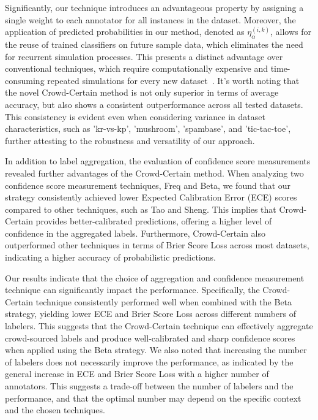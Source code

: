 Significantly, our technique introduces an advantageous property by assigning a single weight to each annotator for all instances in the dataset. Moreover, the application of predicted probabilities in our method, denoted as $\eta_{\alpha}^{(i,k)}$, allows for the reuse of trained classifiers on future sample data, which eliminates the need for recurrent simulation processes. This presents a distinct advantage over conventional techniques, which require computationally expensive and time-consuming repeated simulations for every new dataset~\cite{tao_Label_2020}. It's worth noting that the novel Crowd-Certain method is not only superior in terms of average accuracy, but also shows a consistent outperformance across all tested datasets. This consistency is evident even when considering variance in dataset characteristics, such as 'kr-vs-kp', 'mushroom', 'spambase', and 'tic-tac-toe', further attesting to the robustness and versatility of our approach.

In addition to label aggregation, the evaluation of confidence score measurements revealed further advantages of the Crowd-Certain method. When analyzing two confidence score measurement techniques, Freq and Beta, we found that our strategy consistently achieved lower Expected Calibration Error (ECE) scores compared to other techniques, such as Tao and Sheng. This implies that Crowd-Certain provides better-calibrated predictions, offering a higher level of confidence in the aggregated labels. Furthermore, Crowd-Certain also outperformed other techniques in terms of Brier Score Loss across most datasets, indicating a higher accuracy of probabilistic predictions.

Our results indicate that the choice of aggregation and confidence measurement technique can significantly impact the performance. Specifically, the Crowd-Certain technique consistently performed well when combined with the Beta strategy, yielding lower ECE and Brier Score Loss across different numbers of labelers. This suggests that the Crowd-Certain technique can effectively aggregate crowd-sourced labels and produce well-calibrated and sharp confidence scores when applied using the Beta strategy. We also noted that increasing the number of labelers does not necessarily improve the performance, as indicated by the general increase in ECE and Brier Score Loss with a higher number of annotators. This suggests a trade-off between the number of labelers and the performance, and that the optimal number may depend on the specific context and the chosen techniques.

